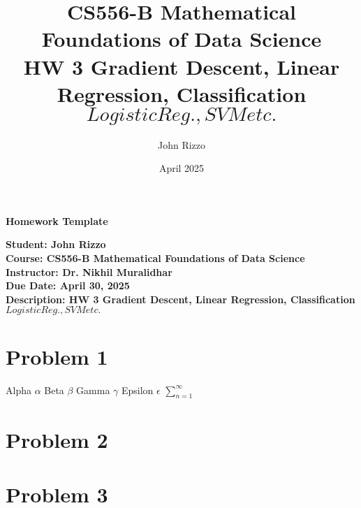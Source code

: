 \documentclass[12pt, letterpaper]{article}
\title{CS556-B Mathematical Foundations of Data Science \\ HW 3 Gradient Descent, Linear Regression, Classification \(Logistic Reg., SVM etc.\)}
\author{John Rizzo}
\date{April 2025}
\newcommand{\studentname}{John Rizzo}
\newcommand{\classname}{CS556-B Mathematical Foundations of Data Science}
\newcommand{\professorname}{Dr. Nikhil Muralidhar}
\newcommand{\assignmentdescription}{HW 3 Gradient Descent, Linear Regression, Classification \(Logistic Reg., SVM etc.\)}
\newcommand{\duedate}{April 30, 2025}
\begin{document}
\begin{center}
    \Large \textbf{Homework Template} \\ [10pt]
\end{center}
\vspace{0.5cm}

\noindent
\normalsize \textbf{Student: \studentname} \\ [5pt]
\textbf{Course: \classname} \\ [5pt]
\textbf{Instructor: \professorname} \\ [5pt]
\textbf{Due Date: \duedate} \\ [5pt]
\textbf{Description: \assignmentdescription}

\vspace{0.5cm}

\section*{Problem 1}

Alpha $\alpha$
Beta $\beta$
Gamma $\gamma$
Epsilon $\epsilon$
$\sum_{n = 1}^{\infty}$

\vspace{1cm}

\section*{Problem 2}

\vspace{1cm}

\section*{Problem 3}

\vspace{1cm}

\end{document}

